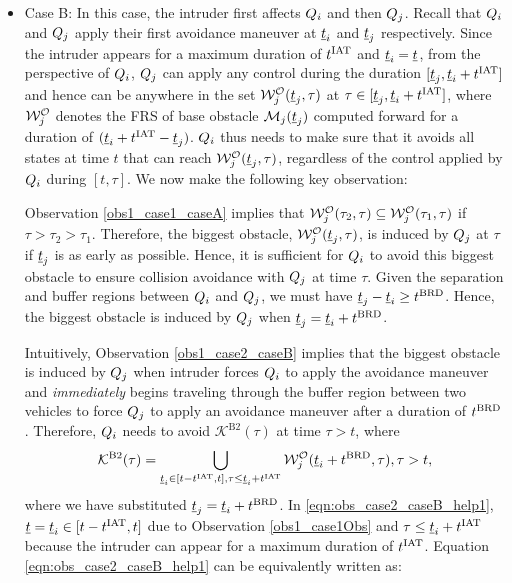 \begin{itemize}[leftmargin=*]
\item \label{sec:intruderObs_case2_caseB} Case B: In this case, the intruder first affects $Q_i$ and then $Q_j$. Recall that $Q_i$ and $Q_j$ apply their first avoidance maneuver at $\underline{t}_i$ and $\underline{t}_j$ respectively. Since the intruder appears for a maximum duration of $t^\text{IAT}$ and $\underline{t}_i = \underline{t}$, from the perspective  of $Q_i$, $Q_j$ can apply any control during the duration $[\underline{t}_j, \underline{t}_i + t^\text{IAT}]$ and hence can be anywhere in the set $\mathcal{W}_{j}^{\mathcal{O}}(\underline{t}_j, \tau)$ at $\tau \in [\underline{t}_j, \underline{t}_i + t^\text{IAT}]$, where $\mathcal{W}_{j}^{\mathcal{O}}$ denotes the FRS of base obstacle $\mathcal{M}_j(\underline{t}_j)$ computed forward for a duration of $(\underline{t}_i + t^\text{IAT} - \underline{t}_j)$. $Q_i$ thus needs to make sure that it avoids all states at time $t$ that can reach $\mathcal{W}_{j}^{\mathcal{O}}(\underline{t}_j, \tau)$, regardless of the control applied by $Q_i$ during $[t, \tau]$. We now make the following key observation:
\begin{observation} \label{obs1_case2_caseB}
Observation \ref{obs1_case1_caseA} implies that $\mathcal{W}_{j}^{\mathcal{O}}(\tau_2, \tau) \subseteq \mathcal{W}_{j}^{\mathcal{O}}(\tau_1, \tau)$ if $\tau > \tau_2 > \tau_1$. Therefore, the biggest obstacle, $\mathcal{W}_{j}^{\mathcal{O}}(\underline{t}_j, \tau)$, is induced by $Q_j$ at $\tau$ if $\underline{t}_j$ is as early as possible. Hence, it is sufficient for $Q_i$ to avoid this biggest obstacle to ensure collision avoidance with $Q_j$ at time $\tau$. Given the separation and buffer regions between $Q_i$ and $Q_j$, we must have $\underline{t}_j - \underline{t}_i \geq t^\text{BRD}$. Hence, the biggest obstacle is induced by $Q_j$ when $\underline{t}_j = \underline{t}_i + t^\text{BRD}$. 
\end{observation}
Intuitively, Observation \ref{obs1_case2_caseB} implies that the biggest obstacle is induced by $Q_j$ when intruder forces $Q_i$ to apply the avoidance maneuver and \textit{immediately} begins traveling through the buffer region between two vehicles to force $Q_j$ to apply an avoidance maneuver after a duration of $t^\text{BRD}$. Therefore, $Q_i$ needs to avoid $\mathcal{K}^{\text{B2}}(\tau)$ at time $\tau > t$, where 
\begin{equation} \label{eqn:obs_case2_caseB_help1}
\mathcal{K}^{\text{B2}}(\tau) =  \bigcup_{\tsa_i \in [t-\iat, t], \tau \leq \tsa_i + \iat} \frs_{j}^{\mathcal{O}}(\tsa_i + \brd, \tau), \tau>t,
\end{equation}
where we have substituted $\underline{t}_j = \underline{t}_i + t^\text{BRD}$. In \eqref{eqn:obs_case2_caseB_help1}, $\underline{t} = \underline{t}_i \in [t-t^\text{IAT}, t]$ due to Observation \ref{obs1_case1Obs} and $\tau \leq \underline{t}_i + t^\text{IAT}$ because the intruder can appear for a maximum duration of $t^\text{IAT}$. Equation \eqref{eqn:obs_case2_caseB_help1} can be equivalently written as:  

\end{itemize}
